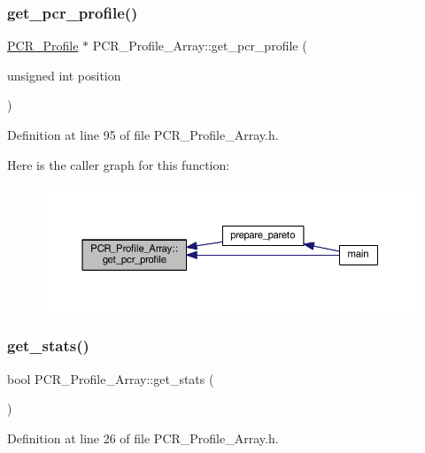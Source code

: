 \subsubsection{\texorpdfstring{get\+\_\+pcr\+\_\+profile()}{get\_pcr\_profile()}}
{\footnotesize\ttfamily \mbox{\hyperlink{class_p_c_r___profile}{P\+C\+R\+\_\+\+Profile}} $\ast$ P\+C\+R\+\_\+\+Profile\+\_\+\+Array\+::get\+\_\+pcr\+\_\+profile (\begin{DoxyParamCaption}\item[{unsigned int}]{position }\end{DoxyParamCaption})}



Definition at line 95 of file P\+C\+R\+\_\+\+Profile\+\_\+\+Array.\+h.

Here is the caller graph for this function\+:
\nopagebreak
\begin{figure}[H]
\begin{center}
\leavevmode
\includegraphics[width=350pt]{class_p_c_r___profile___array_ac17c28f26c27e61b6a6fd4189a4a2201_icgraph}
\end{center}
\end{figure}
\mbox{\label{class_p_c_r___profile___array_ae8ce6ceab4a0e8cf9ad622cc418e1c7f}} 
\subsubsection{\texorpdfstring{get\+\_\+stats()}{get\_stats()}}
{\footnotesize\ttfamily bool P\+C\+R\+\_\+\+Profile\+\_\+\+Array\+::get\+\_\+stats (\begin{DoxyParamCaption}{ }\end{DoxyParamCaption})}



Definition at line 26 of file P\+C\+R\+\_\+\+Profile\+\_\+\+Array.\+h.

